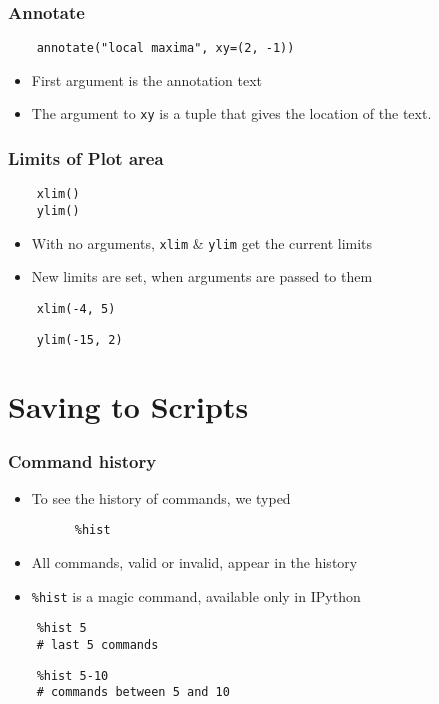 \begin{frame}[fragile]
  \frametitle{Annotate}
  \begin{lstlisting}
    annotate("local maxima", xy=(2, -1))
  \end{lstlisting}
  \begin{itemize}
  \item First argument is the annotation text
  \item The argument to \texttt{xy} is a tuple that gives the location
    of the text. 
  \end{itemize}
\end{frame}

\begin{frame}[fragile]
  \frametitle{Limits of Plot area}
  \begin{lstlisting}
    xlim()
    ylim()
  \end{lstlisting}
  \begin{itemize}
  \item With no arguments, \texttt{xlim} \& \texttt{ylim} get the
    current limits
  \item New limits are set, when arguments are passed to them
  \end{itemize}
  \begin{lstlisting}
    xlim(-4, 5)
  \end{lstlisting}
  \begin{lstlisting}
    ylim(-15, 2)
  \end{lstlisting}
\end{frame}

\section{Saving to Scripts}

\begin{frame}[fragile]
  \frametitle{Command history}
  \begin{itemize}
  \item To see the history of commands, we typed
    \begin{lstlisting}
      %hist
    \end{lstlisting}
  \item All commands, valid or invalid, appear in the history
  \item \texttt{\%hist} is a magic command, available only in IPython
  \end{itemize}
  \begin{lstlisting}
    %hist 5
    # last 5 commands
  \end{lstlisting}
  \begin{lstlisting}
    %hist 5-10
    # commands between 5 and 10
  \end{lstlisting}
\end{frame}

